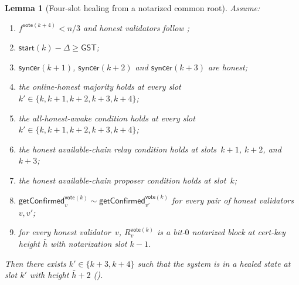 \documentclass{article}
\newcommand{\syncer}{\mathsf{syncer}}
\newcommand{\start}{\mathsf{start}}
\newcommand{\vote}{\mathsf{vote}}
\newcommand{\comm}[1]{\bar{#1}}
\newcommand{\getConfirmed}{\textsf{getConfirmed}\xspace}
\theoremstyle{plain}
\newtheorem{lemma}{Lemma}
\theoremstyle{definition}
\theoremstyle{remark}
\newcommand{\GST}{\ensuremath{\mathsf{GST}}}
\newcommand{\OHM}{online-honest majority\xspace}
\newcommand{\HAP}{honest available-chain proposer\xspace}
\newcommand{\HAR}{honest available-chain relay\xspace}
\newcommand{\AHA}{all-honest-awake\xspace}
\begin{document}
\begin{lemma}[Four-slot healing from a notarized common root]\label{rev:lem:healing-four-slot-from-notarized}
Assume:
\begin{enumerate}
  \item $f^{\vote(k+4)} < n/3$ and honest validators follow ;
  \item $\start(k) - \Delta \geq \GST$;
  \item $\syncer(k+1)$, $\syncer(k+2)$ and $\syncer(k+3)$ are honest;
  \item the \OHM holds at every slot $k' \in \{k, k+1, k+2, k+3, k+4\}$;
  \item the \AHA condition holds at every slot $k' \in \{k, k+1, k+2, k+3, k+4\}$;
  \item the \HAR condition holds at slots~$k+1$, $k+2$, and $k+3$;
  \item the \HAP condition holds at slot~$k$;
  \item $\getConfirmed_v^{\vote(k)} \sim \getConfirmed_{v'}^{\vote(k)}$ for every pair of honest validators~$v, v'$;
  \item for every honest validator~$v$, $R_v^{\vote(k)}$ is a bit-$0$ notarized block at cert-key height $\comm{h}$ with notarization slot $k-1$.
\end{enumerate}
Then there exists $k' \in \{k+3, k+4\}$ such that the system is in a healed state at slot $k'$ with height $\comm{h}+2$ ().
\end{lemma}
\end{document}
